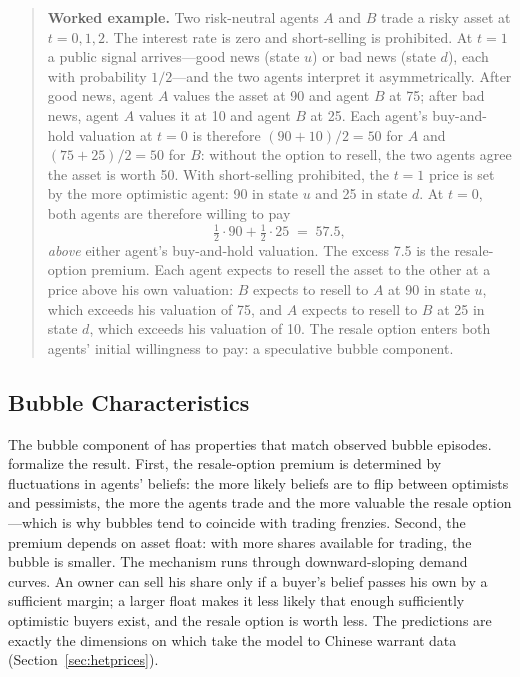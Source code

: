 \begin{quote}
\textbf{Worked example.} Two risk-neutral agents $A$ and $B$ trade a risky asset at $t = 0, 1, 2$. The interest rate is zero and short-selling is prohibited. At $t = 1$ a public signal arrives---good news (state $u$) or bad news (state $d$), each with probability $1/2$---and the two agents interpret it asymmetrically. After good news, agent $A$ values the asset at 90 and agent $B$ at 75; after bad news, agent $A$ values it at 10 and agent $B$ at 25. Each agent's buy-and-hold valuation at $t = 0$ is therefore $(90+10)/2 = 50$ for $A$ and $(75+25)/2 = 50$ for $B$: without the option to resell, the two agents agree the asset is worth 50. With short-selling prohibited, the $t = 1$ price is set by the more optimistic agent: 90 in state $u$ and 25 in state $d$. At $t = 0$, both agents are therefore willing to pay
\[
\tfrac{1}{2} \cdot 90 + \tfrac{1}{2} \cdot 25 \;=\; 57.5,
\]
\emph{above} either agent's buy-and-hold valuation. The excess 7.5 is the resale-option premium. Each agent expects to resell the asset to the other at a price above his own valuation: $B$ expects to resell to $A$ at 90 in state $u$, which exceeds his valuation of 75, and $A$ expects to resell to $B$ at 25 in state $d$, which exceeds his valuation of 10. The resale option enters both agents' initial willingness to pay: a speculative bubble component.
\end{quote}

\subsection{Bubble Characteristics}

The bubble component of \citet{harrison1978} has properties that match observed bubble episodes. \citet{scheinkman2003} formalize the result. First, the resale-option premium is determined by fluctuations in agents' beliefs: the more likely beliefs are to flip between optimists and pessimists, the more the agents trade and the more valuable the resale option---which is why bubbles tend to coincide with trading frenzies. Second, the premium depends on asset float: with more shares available for trading, the bubble is smaller. The mechanism runs through downward-sloping demand curves. An owner can sell his share only if a buyer's belief passes his own by a sufficient margin; a larger float makes it less likely that enough sufficiently optimistic buyers exist, and the resale option is worth less. The predictions are exactly the dimensions on which \citet{xiong2011} take the model to Chinese warrant data (Section~\ref{sec:hetprices}).

